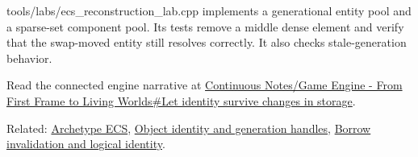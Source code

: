 tools/labs/ecs\_reconstruction\_lab.cpp implements a generational entity pool and a sparse-set component pool. Its tests remove a middle dense element and verify that the swap-moved entity still resolves correctly. It also checks stale-generation behavior.

Read the connected engine narrative at \hyperref[05-engine-i-ch014-let-identity-survive-changes-in-storage]{Continuous Notes/Game Engine - From First Frame to Living Worlds\#Let identity survive changes in storage}.

Related: \hyperref[appendix-fbfeb0430008]{Archetype ECS}, \hyperref[appendix-f1581457d322]{Object identity and generation handles}, \hyperref[appendix-f9b8b9188c7f]{Borrow invalidation and logical identity}.
